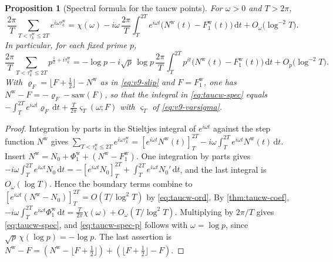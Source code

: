 \documentclass[11pt,a4paper]{article}
\numberwithin{equation}{section}
\newtheorem{proposition}[theorem]{Proposition}
\theoremstyle{definition}
\theoremstyle{remark}
\newcommand{\dd}{\,\mathrm dt}
\begin{document}
\begin{proposition}[Spectral formula for the taucw points]\label{prop:taucw-spec}
For $\omega>0$ and $T>2\pi$,
\begin{equation}\label{eq:taucw-spec}
\frac{2\pi}T\sum_{T<\tau_k^{\mathrm w}\le2T}e^{i\omega\tau_k^{\mathrm w}}=\chi(\omega)-i\omega\,\frac{2\pi}T\int_T^{2T}e^{i\omega t}\bigl(N^{\mathrm w}(t)-F^{\mathrm w}_1(t)\bigr)\dd+O_\omega\bigl(\log^{-2}T\bigr).
\end{equation}
In particular, for each fixed prime $p$,
\begin{equation}\label{eq:taucw-spec-p}
\frac{2\pi}T\sum_{T<\tau_k^{\mathrm w}\le2T}p^{\frac12+i\tau_k^{\mathrm w}}=-\log p-i\sqrt p\,\log p\,\frac{2\pi}T\int_T^{2T}p^{it}\bigl(N^{\mathrm w}(t)-F^{\mathrm w}_1(t)\bigr)\dd+O_p\bigl(\log^{-2}T\bigr).
\end{equation}
With $\varrho_F=\lfloor F+\frac12\rfloor-N^{\mathrm w}$ as in \eqref{eq:v9-slip} and $F=F^{\mathrm w}_1$, one has $N^{\mathrm w}-F=-\varrho_F-\mathrm{saw}(F)$, so that the integral in \eqref{eq:taucw-spec} equals $-\int_T^{2T}e^{i\omega t}\varrho_F\dd+\frac T{2\pi}\varsigma_T(\omega;F)$ with $\varsigma_T$ of \eqref{eq:v9-varsigma}.
\end{proposition}
\begin{proof}
Integration by parts in the Stieltjes integral of $e^{i\omega t}$ against the step function $N^{\mathrm w}$ gives $\sum_{T<\tau_k^{\mathrm w}\le2T}e^{i\omega\tau_k^{\mathrm w}}=[e^{i\omega t}N^{\mathrm w}(t)]_T^{2T}-i\omega\int_T^{2T}e^{i\omega t}N^{\mathrm w}(t)\dd$. Insert $N^{\mathrm w}=N_0+\Phi^{\mathrm w}_1+(N^{\mathrm w}-F^{\mathrm w}_1)$. One integration by parts gives $-i\omega\int_T^{2T}e^{i\omega t}N_0\dd=-[e^{i\omega t}N_0]_T^{2T}+\int_T^{2T}e^{i\omega t}N_0'\dd$, and the last integral is $O_\omega(\log T)$. Hence the boundary terms combine to $[e^{i\omega t}(N^{\mathrm w}-N_0)]_T^{2T}=O(T/\log^2T)$ by \eqref{eq:taucw-ord}. By \cref{thm:taucw-coef}, $-i\omega\int_T^{2T}e^{i\omega t}\Phi^{\mathrm w}_1\dd=\frac T{2\pi}\chi(\omega)+O_\omega(T/\log^2T)$. Multiplying by $2\pi/T$ gives \eqref{eq:taucw-spec}, and \eqref{eq:taucw-spec-p} follows with $\omega=\log p$, since $\sqrt p\,\chi(\log p)=-\log p$. The last assertion is $N^{\mathrm w}-F=(N^{\mathrm w}-\lfloor F+\frac12\rfloor)+(\lfloor F+\frac12\rfloor-F)$.
\end{proof}
\end{document}
